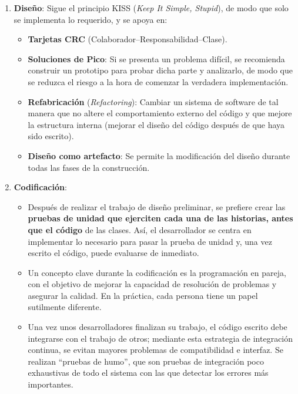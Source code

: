 \begin{enumerate}
   \item \textbf{Diseño}: Sigue el principio KISS (\textit{Keep It Simple, Stupid}), de modo que solo se implementa lo requerido, y se apoya en:
         \begin{itemize} %
            \item \textbf{Tarjetas CRC} (Colaborador--Responsabilidad--Clase).
            \item \textbf{Soluciones de Pico}: Si se presenta un problema difícil, se recomienda construir un prototipo para probar dicha parte y analizarlo, de modo que se reduzca el riesgo a la hora de comenzar la verdadera implementación.
            \item \textbf{Refabricación} (\textit{Refactoring}): Cambiar un sistema de software de tal manera que no altere el comportamiento externo del código y que mejore la estructura interna (mejorar el diseño del código después de que haya sido escrito).
            \item \textbf{Diseño como artefacto}: Se permite la modificación del diseño durante todas las fases de la construcción.
         \end{itemize}

   \item \textbf{Codificación}:
   
   \begin{itemize}
      \item Después de realizar el trabajo de diseño preliminar, se prefiere crear las \textbf{pruebas de unidad que ejerciten cada una de las historias, antes que el código} de las clases. Así, el desarrollador se centra en implementar lo necesario para pasar la prueba de unidad y, una vez escrito el código, puede evaluarse de inmediato.
      \item Un concepto clave durante la codificación es la programación en pareja, con el objetivo de mejorar la capacidad de resolución de problemas y asegurar la calidad. En la práctica, cada persona tiene un papel sutilmente diferente.
      \item Una vez unos desarrolladores finalizan su trabajo, el código escrito debe integrarse con el trabajo de otros; mediante esta estrategia de integración continua, se evitan mayores problemas de compatibilidad e interfaz. Se realizan ``pruebas de humo'', que son pruebas de integración poco exhaustivas de todo el sistema con las que detectar los errores más importantes.
   \end{itemize}


\end{enumerate}

